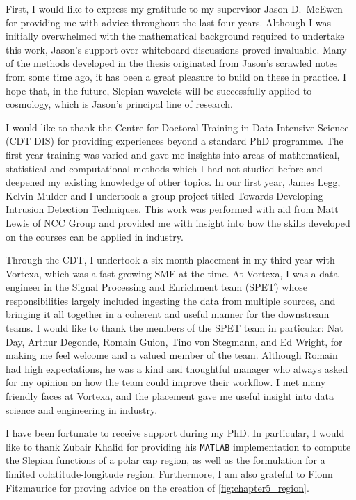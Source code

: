 \begin{acknowledgements}
	First, I would like to express my gratitude to my supervisor Jason D.~McEwen for providing me with advice throughout the last four years.
	Although I was initially overwhelmed with the mathematical background required to undertake this work, Jason's support over whiteboard discussions proved invaluable.
	Many of the methods developed in the thesis originated from Jason's scrawled notes from some time ago, it has been a great pleasure to build on these in practice.
	I hope that, in the future, Slepian wavelets will be successfully applied to cosmology, which is Jason's principal line of research.

	I would like to thank the Centre for Doctoral Training in Data Intensive Science (CDT DIS) for providing experiences beyond a standard PhD programme.
	The first-year training was varied and gave me insights into areas of mathematical, statistical and computational methods which I had not studied before and deepened my existing knowledge of other topics.
	In our first year, James Legg, Kelvin Mulder and I undertook a group project titled Towards Developing Intrusion Detection Techniques.
	This work was performed with aid from Matt Lewis of NCC Group and provided me with insight into how the skills developed on the courses can be applied in industry.

	Through the CDT, I undertook a six-month placement in my third year with Vortexa, which was a fast-growing SME at the time.
	At Vortexa, I was a data engineer in the Signal Processing and Enrichment team (SPET) whose responsibilities largely included ingesting the data from multiple sources, and bringing it all together in a coherent and useful manner for the downstream teams.
	I would like to thank the members of the SPET team in particular: Nat Day, Arthur Degonde, Romain Guion, Tino von Stegmann, and Ed Wright, for making me feel welcome and a valued member of the team.
	Although Romain had high expectations, he was a kind and thoughtful manager who always asked for my opinion on how the team could improve their workflow.
	I met many friendly faces at Vortexa, and the placement gave me useful insight into data science and engineering in industry.

	I have been fortunate to receive support during my PhD.
	In particular, I would like to thank Zubair Khalid for providing his \texttt{MATLAB} implementation to compute the Slepian functions of a polar cap region, as well as the formulation for a limited colatitude-longitude region.
	Furthermore, I am also grateful to Fionn Fitzmaurice for proving advice on the creation of \cref{fig:chapter5_region}.


\end{acknowledgements}
